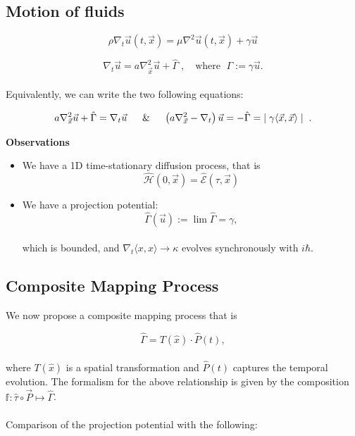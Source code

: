 \documentclass{article}
\begin{document}
\subsection{Motion of fluids}
\[
\rho \nabla_t \vec u(t, \vec x) = \mu \nabla^2 \vec u(t, \vec x) + \gamma \vec u
\]

\[
\nabla_{t} \vec u = a\nabla_{\vec x}^{2} \vec u + \hat{\Gamma} \;,\quad \text{where } \; \Gamma := \gamma \vec u.
\] \\ 
Equivalently, we can write the two following equations: 

\begin{align}
    a \nabla_{\vec x}^{2} \vec u + \hat\Gamma = \nabla_{t} \vec u \quad \And \quad  \left(a\nabla_{\vec x}^{2} - \nabla_{t}\right) \vec u = -\hat\Gamma = \;\mid\gamma\langle \vec x, \vec x\rangle\mid\;.
\end{align}





\textbf{Observations}
\begin{itemize}
    \item We have a 1D time-stationary diffusion process, that is 
    \[
    \hat{\mathcal{H}}(0, \vec x) = \hat{\mathcal{E}}(\tau, \vec x)
    \]
    \item We have a projection potential:
    \[
    \hat\Gamma({\vec u}) := \lim\hat\Gamma = \gamma, 
    \]\\
    which is bounded, and \( \nabla_{t} \langle x, x \rangle \to \kappa\) evolves synchronously with \( i\hbar \).
\end{itemize}

\subsection{Composite Mapping Process}
We now propose a composite mapping process that is 

\[
\hat{\Gamma} = T(\hat{x}) \cdot \hat{P}(t),
\] \\ 
where $T(\hat{x})$ is a spatial transformation and $\hat{P}(t)$ captures the temporal evolution. The formalism for the above relationship is given by the composition $\mathbb{f}:\hat \tau \circ \vec P \mapsto \hat \Gamma $. \\ \\
Comparison of the projection potential with the following:
\end{document}

